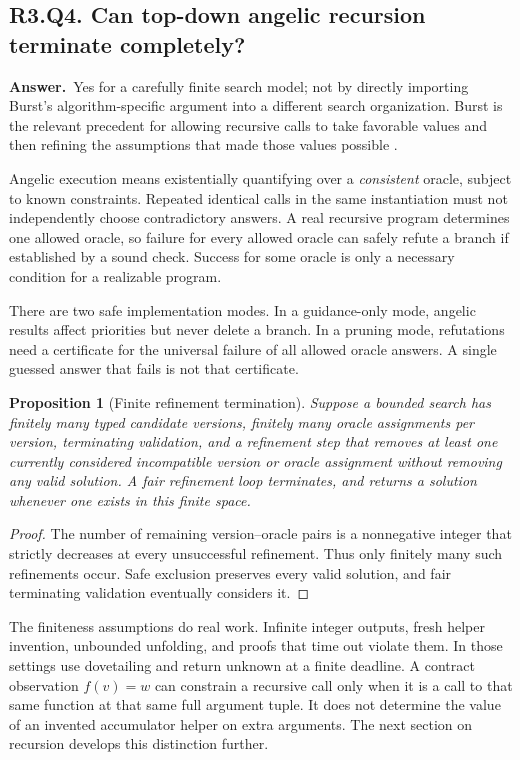\documentclass[11pt,a4paper]{article}
\newtheorem{proposition}[theorem]{Proposition}
\theoremstyle{definition}
\theoremstyle{remark}
\newcommand{\answer}{\par\noindent\textbf{Answer.}\ }
\newcommand{\qheading}[2]{\subsection{#1. #2}}
\begin{document}
\qheading{R3.Q4}{Can top-down angelic recursion terminate completely?}
\answer Yes for a carefully finite search model; not by directly importing
Burst's algorithm-specific argument into a different search organization.
Burst is the relevant precedent for allowing recursive calls to take favorable
values and then refining the assumptions that made those values possible
\cite{burst}.

Angelic execution means existentially quantifying over a \emph{consistent}
oracle, subject to known constraints. Repeated identical calls in the same
instantiation must not independently choose contradictory answers. A real
recursive program determines one allowed oracle, so failure for every allowed
oracle can safely refute a branch if established by a sound check. Success for
some oracle is only a necessary condition for a realizable program.

There are two safe implementation modes. In a guidance-only mode, angelic
results affect priorities but never delete a branch. In a pruning mode,
refutations need a certificate for the universal failure of all allowed oracle
answers. A single guessed answer that fails is not that certificate.

\begin{proposition}[Finite refinement termination]
Suppose a bounded search has finitely many typed candidate versions, finitely
many oracle assignments per version, terminating validation, and a refinement
step that removes at least one currently considered incompatible version or
oracle assignment without removing any valid solution. A fair refinement loop
terminates, and returns a solution whenever one exists in this finite space.
\end{proposition}
\begin{proof}
The number of remaining version--oracle pairs is a nonnegative integer that
strictly decreases at every unsuccessful refinement. Thus only finitely many
such refinements occur. Safe exclusion preserves every valid solution, and
fair terminating validation eventually considers it.
\end{proof}

The finiteness assumptions do real work. Infinite integer outputs, fresh helper
invention, unbounded unfolding, and proofs that time out violate them. In those
settings use dovetailing and return unknown at a finite deadline. A contract
observation $f(v)=w$ can constrain a recursive call only when it is a call to
that same function at that same full argument tuple. It does not determine the
value of an invented accumulator helper on extra arguments. The next section
on recursion develops this distinction further.
\end{document}
